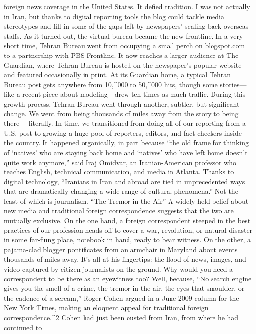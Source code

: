 foreign news coverage in the United States. It defied tradition. I was not actually in Iran,
but thanks to digital reporting tools the blog could tackle media stereotypes and fill in
some of the gaps left by newspapers’ scaling back overseas staffs.
As it turned out, the virtual bureau became the new frontline. In a very short time, Tehran
Bureau went from occupying a small perch on blogspot.com to a partnership with PBS
Frontline. It now reaches a larger audience at The Guardian, where Tehran Bureau is
hosted on the newspaper’s popular website and featured occasionally in print. At its
Guardian home, a typical Tehran Bureau post gets anywhere from 10,^{\href{#endnotes}{000}} to 50,^{\href{#endnotes}{000}} hits,
though some stories—like a recent piece about modeling—drew ten times as much
traffic.
During this growth process, Tehran Bureau went through another, subtler, but significant
change. We went from being thousands of miles away from the story to being there—
literally. In time, we transitioned from doing all of our reporting from a U.S. post to
growing a huge pool of reporters, editors, and fact-checkers inside the country.
It happened organically, in part because ``the old frame for thinking of ‘natives’ who are
staying back home and ‘natives’ who have left home doesn’t quite work anymore,'' said
Iraj Omidvar, an Iranian-American professor who teaches English, technical
communication, and media in Atlanta. Thanks to digital technology, ``Iranians in Iran and
abroad are tied in unprecedented ways that are dramatically changing a wide range of
cultural phenomena.'' Not the least of which is journalism.
``The Tremor in the Air''
A widely held belief about new media and traditional foreign correspondence suggests
that the two are mutually exclusive. On the one hand, a foreign correspondent steeped in
the best practices of our profession heads off to cover a war, revolution, or natural
disaster in some far-flung place, notebook in hand, ready to bear witness. On the other, a
pajama-clad blogger pontificates from an armchair in Maryland about events thousands
of miles away. It’s all at his fingertips: the flood of news, images, and video captured by
citizen journalists on the ground. Why would you need a correspondent to be there as an
eyewitness too?
Well, because, ``No search engine gives you the smell of a crime, the tremor in the air, the
eyes that smoulder, or the cadence of a scream,'' Roger Cohen argued in a June 2009
column for the New York Times, making an eloquent appeal for traditional foreign
correspondence.^{\href{#endnotes}{2}} Cohen had just been ousted from Iran, from where he had continued to
